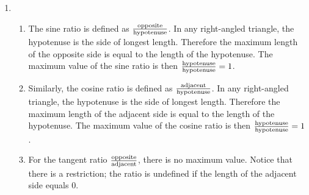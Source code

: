\begin{solutions}{}
{\begin{enumerate}[itemsep=7pt, label=\textbf{\arabic*}. ]
\item %
\begin{enumerate}[noitemsep, label=\textbf{(\alph*)} ]
 \item  The sine ratio is defined as $$.  In any right-angled triangle, the hypotenuse is the side of longest length.  Therefore the maximum length of the opposite side is equal to the length of the hypotenuse.  The maximum value of the sine ratio is then $=1$.
 \item Similarly, the cosine ratio is defined as $$.  In any right-angled triangle, the hypotenuse is the side of longest length.  Therefore the maximum length of the adjacent side is equal to the length of the hypotenuse.  The maximum value of the cosine ratio is then $=1$.
 \item For the tangent ratio $$, there is no maximum value. Notice that there is a restriction; the ratio is undefined if the length of the adjacent side equals $0$.



 \end{enumerate}
\end{enumerate}}
\end{solutions}

